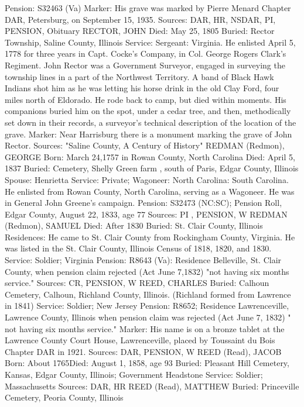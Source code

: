 Pension: S32463 (Va)
Marker: His grave was marked by Pierre Menard Chapter DAR, Petersburg, on September 15, 1935.
Sources: DAR, HR, NSDAR, PI, PENSION, Obituary 
RECTOR, JOHN
Died: May 25, 1805
Buried: Rector Township, Saline County, Illinois 
Service: Sergeant: Virginia. He enlisted April 5, 1778 for three years in Capt. Cocke's Company, in Col. George Rogers Clark's Regiment. John Rector was a Government Surveyor, engaged in surveying the township lines in a part of the Northwest Territory. A band of Black Hawk Indians shot him as he was letting his horse drink in the old Clay Ford, four miles north of Eldor­ado. He rode back to camp, but died within moments. His companions buried him on the spot, under a cedar tree, and then, methodically set down in their records, a surveyor's technical description of the location of the grave. 
Marker: Near Harrisburg there is a monument marking the grave of John Rector. 
Sources: "Saline County, A Century of History" 
REDMAN (Redmon), GEORGE
Born: March 24,1757 in Rowan County, North Carolina
Died:  April 5, 1837
Buried: Cemetery, Shelly Green farm , south of Paris, Edgar County, Illinois
Spouse: Henrietta
Service: Private; Wagoneer: North Carolina: South Carolina. He enlisted from 
Rowan County, North Carolina, serving as a Wagoneer. He was in General John Greene's campaign. 
Pension: S32473 (NC:SC); Pension Roll, Edgar County, August 22, 1833, age 77
Sources: PI , PENSION, W 
REDMAN (Redmon), SAMUEL
Died:  After 1830
Buried: St. Clair County, Illinois 
Residences: He came to St. Clair County from Rockingham County, Virginia. He was listed in the St. Clair County, Illinois Census of 1818, 1820, and 1830.
Service: Soldier; Virginia 
Pension: R8643 (Va): 
Residence Belleville, St. Clair County, when pension claim rejected (Act June 7,1832) "not having six months service."
Sources: CR, PENSION, W 
REED, CHARLES
Buried: Calhoun Cemetery, Calhoun, Richland County, Illinois. (Richland formed 
from Lawrence in 1841)
Service: Soldier; New Jersey 
Pension: R8652; Residence Lawrenceville, Lawrence County, Illinois when pension claim was rejected (Act June 7, 1832) " not having six months service."
Marker: His name is on a bronze tablet at the Lawrence County Court House, Lawrenceville, placed by Toussaint du Bois Chapter DAR in 1921.
Sources: DAR, PENSION, W 
REED (Read), JACOB
Born: About 1765Died:  August 1, 1858, age 93 
Buried: Pleasant Hill Cemetery, Kansas, Edgar County, Illinois; Government Headstone
Service: Soldier; Massachusetts 
Sources: DAR, HR 
REED (Read), MATTHEW
Buried: Princeville Cemetery, Peoria County, Illinois
